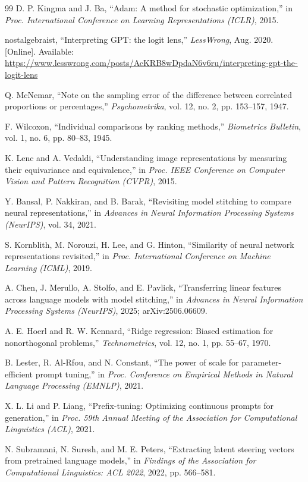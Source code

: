 \begin{thebibliography}{99}
 D. P. Kingma and J. Ba, ``Adam: A method for stochastic optimization,'' in \textit{Proc. International Conference on Learning Representations (ICLR)}, 2015.

 nostalgebraist, ``Interpreting GPT: the logit lens,'' \textit{LessWrong}, Aug. 2020. [Online]. Available: \url{https://www.lesswrong.com/posts/AcKRB8wDpdaN6v6ru/interpreting-gpt-the-logit-lens}

 Q. McNemar, ``Note on the sampling error of the difference between correlated proportions or percentages,'' \textit{Psychometrika}, vol. 12, no. 2, pp. 153--157, 1947.

 F. Wilcoxon, ``Individual comparisons by ranking methods,'' \textit{Biometrics Bulletin}, vol. 1, no. 6, pp. 80--83, 1945.

 K. Lenc and A. Vedaldi, ``Understanding image representations by measuring their equivariance and equivalence,'' in \textit{Proc. IEEE Conference on Computer Vision and Pattern Recognition (CVPR)}, 2015.

 Y. Bansal, P. Nakkiran, and B. Barak, ``Revisiting model stitching to compare neural representations,'' in \textit{Advances in Neural Information Processing Systems (NeurIPS)}, vol. 34, 2021.

 S. Kornblith, M. Norouzi, H. Lee, and G. Hinton, ``Similarity of neural network representations revisited,'' in \textit{Proc. International Conference on Machine Learning (ICML)}, 2019.

 A. Chen, J. Merullo, A. Stolfo, and E. Pavlick, ``Transferring linear features across language models with model stitching,'' in \textit{Advances in Neural Information Processing Systems (NeurIPS)}, 2025; arXiv:2506.06609.

 A. E. Hoerl and R. W. Kennard, ``Ridge regression: Biased estimation for nonorthogonal problems,'' \textit{Technometrics}, vol. 12, no. 1, pp. 55--67, 1970.

 B. Lester, R. Al-Rfou, and N. Constant, ``The power of scale for parameter-efficient prompt tuning,'' in \textit{Proc. Conference on Empirical Methods in Natural Language Processing (EMNLP)}, 2021.

 X. L. Li and P. Liang, ``Prefix-tuning: Optimizing continuous prompts for generation,'' in \textit{Proc. 59th Annual Meeting of the Association for Computational Linguistics (ACL)}, 2021.

 N. Subramani, N. Suresh, and M. E. Peters, ``Extracting latent steering vectors from pretrained language models,'' in \textit{Findings of the Association for Computational Linguistics: ACL 2022}, 2022, pp. 566--581.


\end{thebibliography}
